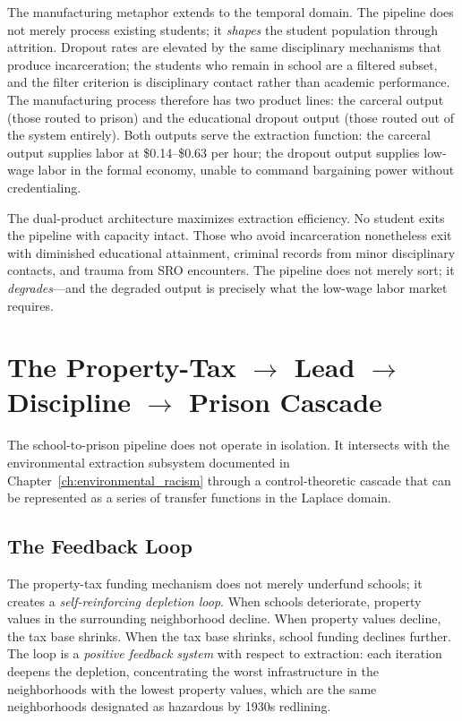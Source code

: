 The manufacturing metaphor extends to the temporal domain. The pipeline does not merely process existing students; it \textit{shapes} the student population through attrition. Dropout rates are elevated by the same disciplinary mechanisms that produce incarceration; the students who remain in school are a filtered subset, and the filter criterion is disciplinary contact rather than academic performance. The manufacturing process therefore has two product lines: the carceral output (those routed to prison) and the educational dropout output (those routed out of the system entirely). Both outputs serve the extraction function: the carceral output supplies labor at \$0.14--\$0.63 per hour; the dropout output supplies low-wage labor in the formal economy, unable to command bargaining power without credentialing.

The dual-product architecture maximizes extraction efficiency. No student exits the pipeline with capacity intact. Those who avoid incarceration nonetheless exit with diminished educational attainment, criminal records from minor disciplinary contacts, and trauma from SRO encounters. The pipeline does not merely sort; it \textit{degrades}---and the degraded output is precisely what the low-wage labor market requires.

\section{The Property-Tax $\rightarrow$ Lead $\rightarrow$ Discipline $\rightarrow$ Prison Cascade}
\label{sec:lead_cascade}

The school-to-prison pipeline does not operate in isolation. It intersects with the environmental extraction subsystem documented in Chapter~\ref{ch:environmental_racism} through a control-theoretic cascade that can be represented as a series of transfer functions in the Laplace domain.

\subsection{The Feedback Loop}

The property-tax funding mechanism does not merely underfund schools; it creates a \textit{self-reinforcing depletion loop}. When schools deteriorate, property values in the surrounding neighborhood decline. When property values decline, the tax base shrinks. When the tax base shrinks, school funding declines further. The loop is a \textit{positive feedback system} with respect to extraction: each iteration deepens the depletion, concentrating the worst infrastructure in the neighborhoods with the lowest property values, which are the same neighborhoods designated as hazardous by 1930s redlining.

